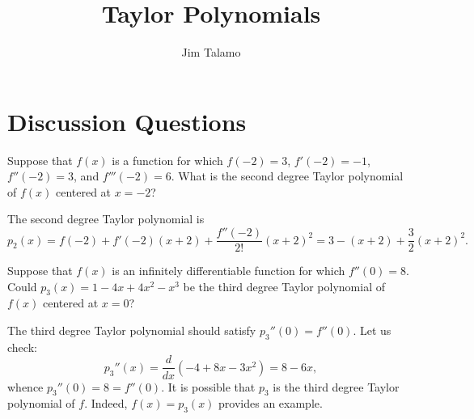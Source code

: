 \documentclass[]{ximera}
\author{Jim Talamo}
\title{Taylor Polynomials}
\begin{document}
\begin{abstract}
\end{abstract}
\maketitle

\vspace{-0.9in}

\section{Discussion Questions}

\begin{problem} 
Suppose that $f(x)$ is a function for which $f(-2)=3$, $f'(-2) =-1$, $f''(-2)=3$, and $f'''(-2)=6$.  What is the second degree Taylor polynomial of $f(x)$ centered at $x=-2$?

\begin{solution}
The second degree Taylor polynomial is 
$$
p_2(x) = f(-2) + f'(-2)(x+2) + \frac{f''(-2)}{2!}(x+2)^2 = 3 - (x+2) + \frac{3}{2}(x+2)^2.
$$
\end{solution}
\end{problem}


\begin{problem} 
Suppose that $f(x)$ is an infinitely differentiable function for which $f''(0)=8$.  Could $p_3(x) = 1-4x+4x^2-x^3$ be the third degree Taylor polynomial of $f(x)$ centered at $x=0$?

\begin{solution}
The third degree Taylor polynomial should satisfy $p_3''(0) = f''(0)$. Let us check:
$$
p_3''(x) = \frac{d}{dx} \left(-4 + 8x - 3x^2\right) = 8 - 6x,
$$
whence $p_3''(0)=8 = f''(0)$. It is possible that $p_3$ is the third degree Taylor polynomial of $f$. Indeed, $f(x)=p_3(x)$ provides an example.
\end{solution}
\end{problem}
\end{document}
